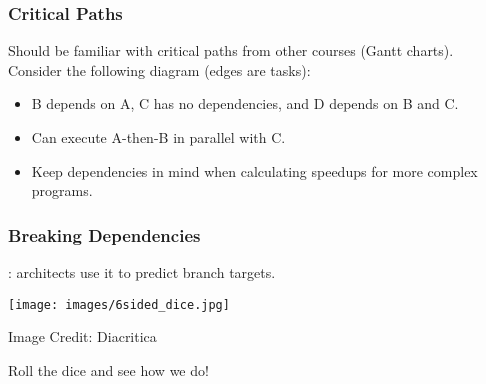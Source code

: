 \begin{frame}
  \frametitle{Critical Paths}

  

  Should be familiar with critical paths from other courses (Gantt charts).\\[1em]

  Consider the following diagram (edges are tasks):

\begin{center}
\end{center}

  \begin{itemize}
    \item B depends on A, C has no dependencies, and D depends on B and C.
    \item Can execute A-then-B in parallel with C.
    \item Keep dependencies in mind when calculating speedups for more
      complex programs.
  \end{itemize}
  
\end{frame}


\begin{frame}
  \frametitle{Breaking Dependencies}

  
  : architects use it to predict
      branch targets.
  
  \begin{center}
  	\texttt{[image: images/6sided\_dice.jpg]}
  \end{center}
  	\hfill Image Credit: Diacritica

Roll the dice and see how we do!

\end{frame}


